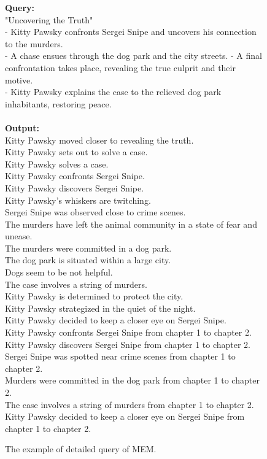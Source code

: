 \begin{figure}[htbp]
\centering
\begin{tcolorbox}
\textbf{Query:}\\
"Uncovering the Truth"\\
- Kitty Pawsky confronts Sergei Snipe and uncovers his connection to the murders.\\
- A chase ensues through the dog park and the city streets.
- A final confrontation takes place, revealing the true culprit and their motive.\\
- Kitty Pawsky explains the case to the relieved dog park inhabitants, restoring peace.\\
\\
\textbf{Output:}\\
Kitty Pawsky moved closer to revealing the truth.\\
Kitty Pawsky sets out to solve a case.\\
Kitty Pawsky solves a case.\\
Kitty Pawsky confronts Sergei Snipe.\\
Kitty Pawsky discovers Sergei Snipe.\\
Kitty Pawsky's whiskers are twitching.\\
Sergei Snipe was observed close to crime scenes.\\
The murders have left the animal community in a state of fear and unease.\\
The murders were committed in a dog park.\\
The dog park is situated within a large city.\\
Dogs seem to be not helpful.\\
The case involves a string of murders.\\
Kitty Pawsky is determined to protect the city.\\
Kitty Pawsky strategized in the quiet of the night.\\
Kitty Pawsky decided to keep a closer eye on Sergei Snipe.\\
Kitty Pawsky confronts Sergei Snipe from chapter 1 to chapter 2.\\
Kitty Pawsky discovers Sergei Snipe from chapter 1 to chapter 2.\\
Sergei Snipe was spotted near crime scenes from chapter 1 to chapter 2.\\
 Murders were committed in the dog park from chapter 1 to chapter 2.\\
The case involves a string of murders from chapter 1 to chapter 2.\\
Kitty Pawsky decided to keep a closer eye on Sergei Snipe from chapter 1 to chapter 2.\\
\end{tcolorbox}
\caption{The example of detailed query of MEM.}
\label{tab:detailed_query}
\end{figure}



